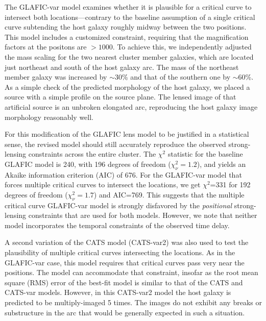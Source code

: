 The GLAFIC-var model examines whether it is plausible for a critical
curve to intersect both \spock locations---contrary to the baseline
assumption of a single critical curve subtending the \spock host
galaxy roughly midway between the two positions.  This model includes
a customized constraint, requiring that the magnification factors at
the \spock positons are $>1000$.  To achieve this, we independently
adjusted the mass scaling for the two nearest cluster member galaxies,
which are located just northeast and south of the \spock host galaxy
arc.  The mass of the northeast member galaxy was increased by
$\sim$30\% and that of the southern one by $\sim$60\%.  As a simple
check of the predicted morphology of the host galaxy, we placed a
source with a simple \citet{Sersic:1963} profile on the source
plane. The lensed image of that artificial source is an unbroken
elongated arc, reproducing the host galaxy image morphology reasonably
well.

For this modification of the GLAFIC lens model to be justified in a
statistical sense, the revised model should still accurately reproduce
the observed strong-lensing constraints across the entire cluster.
The $\chi^2$ statistic for the baseline GLAFIC model is 240, with 196
degrees of freedom ($\chi^2_\nu=1.2$), and yields an Akaike
information criterion (AIC)\citep{Akaike:1974} of 676.  For the
GLAFIC-var model that forces multiple critical curves to intersect the
\spock locations, we get $\chi^2$=331 for 192 degrees of freedom
($\chi^2_\nu=1.7$) and AIC=769.  This suggests that the multiple
critical curve GLAFIC-var model is strongly disfavored by the
{\it positional} strong-lensing constraints that are used for both models.
However, we note that neither model incorporates the temporal
constraints of the observed time delay. 

A second variation of the CATS model (CATS-var2) was also used to test
the plausibility of multiple critical curves intersecting the \spock
locations.  As in the GLAFIC-var case, this model requires that
critical curves pass very near the \spock positions.  The model can
accommodate that constraint, insofar as the root mean square (RMS)
error of the best-fit model is similar to that of the CATS and
CATS-var models.  However, in this CATS-var2 model the \spock host
galaxy is predicted to be multiply-imaged 5 times. The \HST images do
not exhibit any breaks or substructure in the arc that would be
generally expected in such a situation.  

